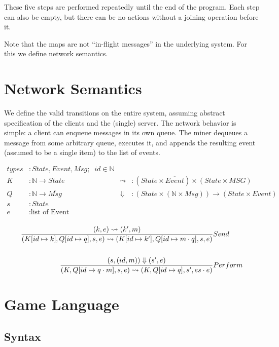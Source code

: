 \documentclass[acmsmall,review,anonymous]{acmart}\settopmatter{printfolios=true}
\begin{document}
These five steps are performed repeatedly until the end of the program. Each step can also be empty, but there can be no actions without a joining operation before it.

Note that the maps are not ``in-flight messages'' in the underlying system. For this we define network semantics.

\section{Network Semantics}

We define the valid transitions on the entire system, assuming abstract specification of the clients and the (single) server. The network behavior is simple: a client can enqueue messages in its own queue. The miner dequeues a message from some arbitrary queue, executes it, and appends the resulting event (assumed to be a single item) to the list of events.

\begin{align*}
types &: State, Event, Msg; \;\; id \in \mathbb{N} \\
K &: \mathbb{N} \rightarrow State \; & \leadsto &: (State \times \overline{Event}) \times (State \times MSG) \\
Q &: \mathbb{N} \rightarrow \overline{Msg} \; & \Downarrow &: (State \times (\mathbb{N} \times Msg)) \rightarrow (State \times Event) \\
s &: State \\
e &: \text{list of Event} \\
\end{align*}

\begin{align*}
\judge{&Send}{
	(k, e) \leadsto (k', m)
}{
	(K[id \mapsto k], Q[id \mapsto q], s, e) \leadsto (K[id \mapsto k'], Q[id \mapsto m \cdot q], s, e)
}
\\
\\
\judge{&Perform}{
    (s, (id, m)) \Downarrow (s', e)
}{
	(K, Q[id \mapsto q \cdot m], s, e) \leadsto (K, Q[id \mapsto q], s', es \cdot e)
}
\end{align*}

\pagebreak

\setlength{\grammarindent }{2cm}

\section{Game Language}

\subsection{Syntax}
\end{document}
